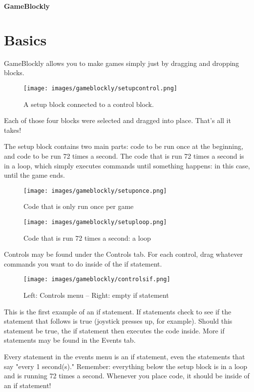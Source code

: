 \documentclass{article}
\begin{document}
\begin{center}
  \huge \textbf{GameBlockly}
\end{center}
\section{Basics}
GameBlockly allows you to make games simply just by dragging and dropping blocks.

\begin{figure}[h!]
  {\centering
    \texttt{[image: images/gameblockly/setupcontrol.png]}
    \caption{A setup block connected to a control block.}
    }
\end{figure}

Each of those four blocks were selected and dragged into place.  That's all it takes!

The setup block contains two main parts: code to be run once at the beginning, and code to be run 72 times a second.  The code that is run 72 times a second is in a loop, which simply executes commands until something happens: in this case, until the game ends.

\begin{figure}[h!]
  {\centering
    \texttt{[image: images/gameblockly/setuponce.png]}
    \caption{Code that is only run once per game}
    }
\end{figure}

\begin{figure}[h!]
  {\centering
    \texttt{[image: images/gameblockly/setuploop.png]}
    \caption{Code that is run 72 times a second: a loop}
    }
\end{figure}


Controls may be found under the Controls tab.  For each control, drag whatever commands you want to do inside of the if statement.

\begin{figure}[h!]
  {\centering
    \texttt{[image: images/gameblockly/controlsif.png]}
    \caption{Left: Controls menu -- Right: empty if statement}
    }
\end{figure}

This is the first example of an if statement.  If statements check to see if the statement that follows is true (joystick presses up, for example).  Should this statement be true, the if statement then executes the code inside.  More if statements may be found in the Events tab.

Every statement in the events menu is an if statement, even the statements that say "every 1 second(s)."  Remember: everything below the setup block is in a loop and is running 72 times a second.  Whenever you place code, it should be inside of an if statement!
\end{document}

